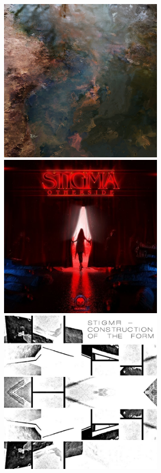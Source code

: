 \documentclass[12pt,landscape]{article}
\begin{document}
{\begin{center}
\begin{figure}[!htb]
  \includegraphics[width=8cm]{particles.jpg}

\endminipage\hfill
{}
  \includegraphics[width=8cm]{otherside.jpg}

\endminipage\hfill
{}%
  \includegraphics[width=8cm]{construction.jpg}


\end{figure}
\end{center}}
\end{document}
